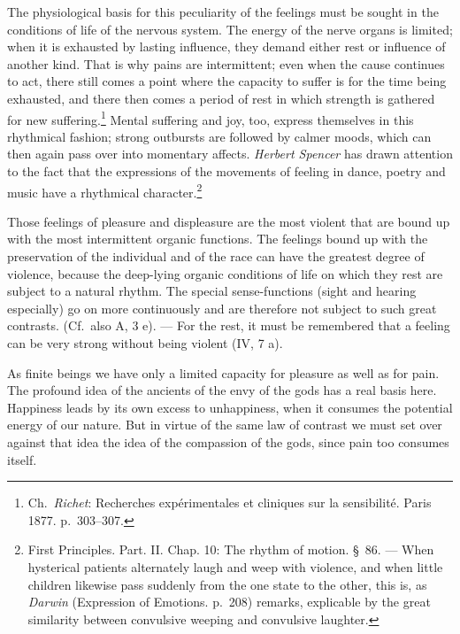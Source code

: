 \documentclass[12pt,a4paper]{book}
\newcommand{\opage}[1]{\marginnote{\footnotesize\textit{[#1]}}}
\begin{document}
The physiological basis for this peculiarity of the feelings must be
sought in the conditions of life of the nervous system. The energy of
the nerve organs is limited; when it is exhausted by lasting influence,
they demand either rest or influence of another kind. That is why pains
are intermittent; even when the cause continues to act, there still
comes a point where the capacity to suffer is for the time being
exhausted, and there then comes a
\opage{329}period of rest in which strength is gathered for new
suffering.\footnote{Ch.~\emph{Richet}: Recherches expérimentales et
cliniques sur la sensibilité. Paris 1877. p.~303--307.} Mental suffering
and joy, too, express themselves in this rhythmical fashion; strong
outbursts are followed by calmer moods, which can then again pass over
into momentary affects. \emph{Herbert Spencer} has drawn attention to
the fact that the expressions of the movements of feeling in dance,
poetry and music have a rhythmical
character.\footnote{First Principles. Part. II. Chap. 10: The rhythm
of motion. \S~86. --- When hysterical patients alternately laugh and
weep with violence, and when little children likewise pass suddenly
from the one state to the other, this is, as \emph{Darwin} (Expression
of Emotions. p.~208) remarks, explicable by the great similarity between
convulsive weeping and convulsive laughter.}

Those feelings of pleasure and displeasure are the most violent that are
bound up with the most intermittent organic functions. The feelings
bound up with the preservation of the individual and of the race can
have the greatest degree of violence, because the deep-lying organic
conditions of life on which they rest are subject to a natural rhythm.
The special sense-functions (sight and hearing especially) go on more
continuously and are therefore not subject to such great contrasts.
(Cf.\ also A, 3 e). --- For the rest, it must be remembered that a
feeling can be very strong without being violent (IV, 7 a).

As finite beings we have only a limited capacity for pleasure as well
as for pain. The profound idea of the ancients of the envy of the gods
has a real basis here. Happiness leads by its own excess to
unhappiness, when it consumes the potential energy of our nature. But
in virtue of the same law of contrast we must set over against that idea
the idea of the compassion of the gods, since pain too consumes itself.
\end{document}
